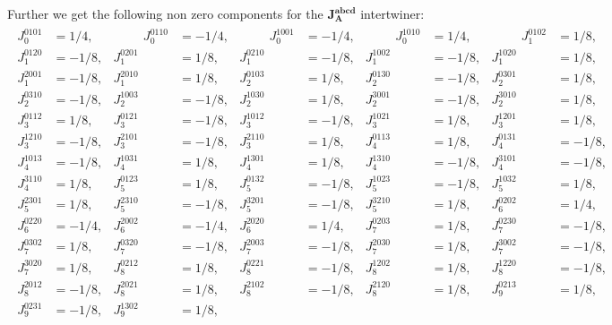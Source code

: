 \documentclass[a4paper,12pt, DIV=14, BCOR=5mm, twoside, headsepline, numbers=noenddot]{scrbook}
\begin{document}
Further we get the following non zero components for the $\boldsymbol{J_A^{abcd}}$ intertwiner:
\begin{align}\label{AreaJ}
    \begin{alignedat}{5}
    J_{0}^{0101} &= 1/4, & \hspace{1cm}
J_{0}^{0110} &= -1/4, & \hspace{1cm}
J_{0}^{1001} &= -1/4, & \hspace{1cm}
J_{0}^{1010} &= 1/4, & \hspace{1cm}
J_{1}^{0102} &= 1/8, \\ 
J_{1}^{0120} &= -1/8, & 
J_{1}^{0201} &= 1/8, & 
J_{1}^{0210} &= -1/8, & 
J_{1}^{1002} &= -1/8, & 
J_{1}^{1020} &= 1/8, \\ 
J_{1}^{2001} &= -1/8, & 
J_{1}^{2010} &= 1/8, & 
J_{2}^{0103} &= 1/8, & 
J_{2}^{0130} &= -1/8, & 
J_{2}^{0301} &= 1/8, \\ 
J_{2}^{0310} &= -1/8, & 
J_{2}^{1003} &= -1/8, & 
J_{2}^{1030} &= 1/8, & 
J_{2}^{3001} &= -1/8, & 
J_{2}^{3010} &= 1/8, \\ 
J_{3}^{0112} &= 1/8, & 
J_{3}^{0121} &= -1/8, & 
J_{3}^{1012} &= -1/8, & 
J_{3}^{1021} &= 1/8, & 
J_{3}^{1201} &= 1/8, \\ 
J_{3}^{1210} &= -1/8, & 
J_{3}^{2101} &= -1/8, & 
J_{3}^{2110} &= 1/8, & 
J_{4}^{0113} &= 1/8, & 
J_{4}^{0131} &= -1/8, \\ 
J_{4}^{1013} &= -1/8, & 
J_{4}^{1031} &= 1/8, & 
J_{4}^{1301} &= 1/8, & 
J_{4}^{1310} &= -1/8, & 
J_{4}^{3101} &= -1/8,  \\
J_{4}^{3110} &= 1/8, & 
J_{5}^{0123} &= 1/8, & 
J_{5}^{0132} &= -1/8, & 
J_{5}^{1023} &= -1/8, & 
J_{5}^{1032} &= 1/8, \\ 
J_{5}^{2301} &= 1/8, & 
J_{5}^{2310} &= -1/8, & 
J_{5}^{3201} &= -1/8, & 
J_{5}^{3210} &= 1/8, & 
J_{6}^{0202} &= 1/4, \\ 
J_{6}^{0220} &= -1/4, & 
J_{6}^{2002} &= -1/4, & 
J_{6}^{2020} &= 1/4, & 
J_{7}^{0203} &= 1/8, & 
J_{7}^{0230} &= -1/8, \\ 
J_{7}^{0302} &= 1/8, & 
J_{7}^{0320} &= -1/8, & 
J_{7}^{2003} &= -1/8, & 
J_{7}^{2030} &= 1/8, & 
J_{7}^{3002} &= -1/8, \\ 
J_{7}^{3020} &= 1/8, & 
J_{8}^{0212} &= 1/8, & 
J_{8}^{0221} &= -1/8, & 
J_{8}^{1202} &= 1/8, & 
J_{8}^{1220} &= -1/8, \\ 
J_{8}^{2012} &= -1/8, & 
J_{8}^{2021} &= 1/8, & 
J_{8}^{2102} &= -1/8, & 
J_{8}^{2120} &= 1/8, & 
J_{9}^{0213} &= 1/8, \\ 
J_{9}^{0231} &= -1/8, & 
J_{9}^{1302} &= 1/8, & 

\end{alignedat}
\end{align}
\end{document}
